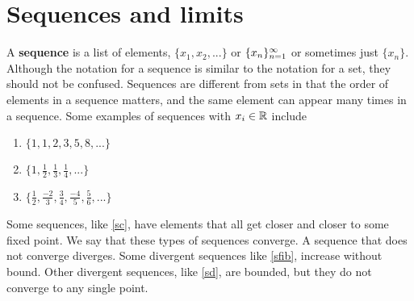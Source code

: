 \section{Sequences and limits}

A \textbf{sequence} is a list of elements, $\{x_1, x_2, ... \}$ or
$\{{x}_n \}_{n=1}^\infty$ or sometimes just $\{x_n\}$. Although the notation for a
sequence is similar to the notation for a set, they should not be
confused. Sequences are different from sets in that the order of
elements in a sequence matters, and the same element can appear many
times in a sequence.  Some examples of sequences with $x_i \in \mathbb{R}$
include
\begin{enumerate}
\item\label{sfib} $\{ 1, 1, 2, 3, 5, 8, ... \}$
\item\label{sc} $\{ 1, \frac{1}{2}, \frac{1}{3}, \frac{1}{4}, ... \}$
\item\label{sd} $\{\frac{1}{2}, \frac{-2}{3}, \frac{3}{4}, \frac{-4}{5},
  \frac{5}{6}, ... \}$
\end{enumerate}
Some sequences, like \ref{sc}, have elements that all get closer and
closer to some fixed point. We say that these types of sequences
converge. A sequence that does not converge diverges. Some divergent
sequences like \ref{sfib}, increase without bound. Other divergent
sequences, like \ref{sd}, are bounded, but they do not converge to any
single point. 

